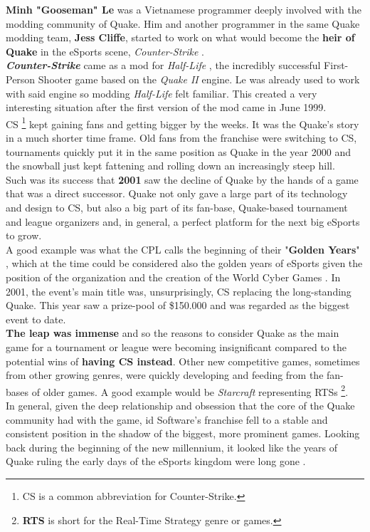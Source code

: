 \textbf{Minh "Gooseman" Le} \citep{gooseman} was a Vietnamese programmer deeply involved with the modding community of Quake. Him and another programmer in the same Quake modding team, \textbf{Jess Cliffe}, started to work on what would become the \textbf{heir of Quake} in the eSports scene, \textit{Counter-Strike} \citep{game:cs}.\\

\textit{\textbf{Counter-Strike}} came as a mod for \textit{Half-Life} \parencite{game:halflife}, the incredibly successful First-Person Shooter game based on the \textit{Quake II} engine. Le was already used to work with said engine so modding \textit{Half-Life} felt familiar. This created a very interesting situation after the first version of the mod came in June 1999.\\

CS \footnote{CS is a common abbreviation for Counter-Strike.} kept gaining fans and getting bigger by the weeks. It was the Quake's story in a much shorter time frame. Old fans from the franchise were switching to CS, tournaments quickly put it in the same position as Quake in the year 2000 and the snowball just kept fattening and rolling down an increasingly steep hill.\\

Such was its success that \textbf{2001} saw the decline of Quake by the hands of a game that was a direct successor. Quake not only gave a large part of its technology and design to CS, but also a big part of its fan-base, Quake-based tournament and league organizers and, in general, a perfect platform for the next big eSports to grow.\\

A good example was what the CPL calls the beginning of their "\textbf{Golden Years}" \citep{web:cpl}, which at the time could be considered also the golden years of eSports given the position of the organization and the creation of the World Cyber Games \citep{WCG} \parencite[p.~28]{snavely2014history}. In 2001, the event's main title was, unsurprisingly, CS replacing the long-standing Quake. This year saw a prize-pool of \$150.000 and was regarded as the biggest event to date.\\

\textbf{The leap was immense} \citep{hope2014evolution} and so the reasons to consider Quake as the main game for a tournament or league were becoming insignificant compared to the potential wins of \textbf{having CS instead}. Other new competitive games, sometimes from other growing genres, were quickly developing and feeding from the fan-bases of older games. A good example would be \textit{Starcraft} \citep{game:starcraft} representing RTSs \footnote{\textbf{RTS} is short for the Real-Time Strategy genre or games.}.\\

In general, given the deep relationship and obsession that the core of the Quake community had with the game, id Software's franchise fell to a stable and consistent position in the shadow of the biggest, more prominent games. Looking back during the beginning of the new millennium, it looked like the years of Quake ruling the early days of the eSports kingdom were long gone \parencite{edwards2013esports}.
